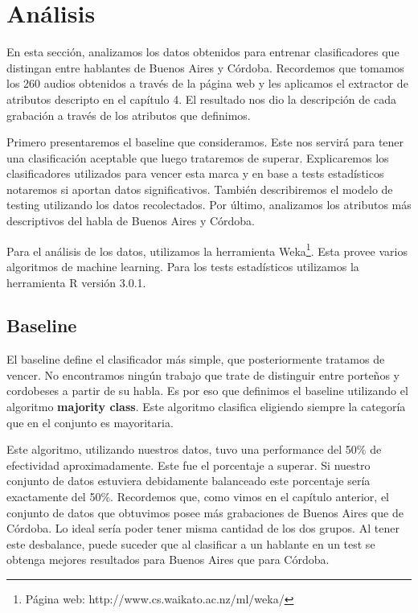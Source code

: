 \chapter{Análisis}

En esta sección, analizamos los datos obtenidos para entrenar clasificadores que distingan entre hablantes de Buenos Aires y Córdoba. Recordemos que tomamos los 260 audios obtenidos a través de la página web y les aplicamos el extractor de atributos descripto en el capítulo 4. El resultado nos dio la descripción de cada grabación a través de los atributos que definimos. 

Primero presentaremos el baseline que consideramos. Este nos servirá para tener una clasificación aceptable que luego trataremos de superar. Explicaremos los clasificadores utilizados para vencer esta marca y en base a tests estadísticos notaremos si aportan datos significativos. También describiremos el modelo de testing utilizando los datos recolectados. Por último, analizamos los atributos más descriptivos del habla de Buenos Aires y Córdoba. 

Para el análisis de los datos, utilizamos la herramienta Weka\footnote{Página web: http://www.cs.waikato.ac.nz/ml/weka/}. Esta provee varios algoritmos de machine learning. Para los tests estadísticos utilizamos la herramienta R versión 3.0.1. 

\section{Baseline}

El baseline define el clasificador más simple, que posteriormente tratamos de vencer. No encontramos ningún trabajo que trate de distinguir entre porteños y cordobeses a partir de su habla. Es por eso que definimos el baseline utilizando el algoritmo \textbf{majority class}. Este algoritmo clasifica eligiendo siempre la categoría que en el conjunto es mayoritaria.

Este algoritmo, utilizando nuestros datos, tuvo una performance del 50\% de efectividad aproximadamente. Este fue el porcentaje a superar. Si nuestro conjunto de datos estuviera debidamente balanceado este porcentaje sería exactamente del 50\%. Recordemos que, como vimos en el capítulo anterior, el conjunto de datos que obtuvimos posee más grabaciones de Buenos Aires que de Córdoba. Lo ideal sería poder tener misma cantidad de los dos grupos. Al tener este desbalance, puede suceder que al clasificar a un hablante en un test se obtenga mejores resultados para Buenos Aires que para Córdoba. 

